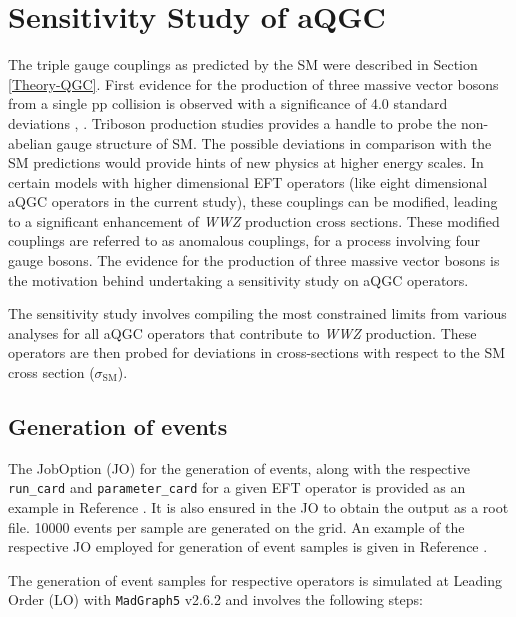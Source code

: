 \section{Sensitivity Study of aQGC}\label{SensitivityStudy}

The triple gauge couplings as predicted by the SM were described in Section \ref{Theory-QGC}. First evidence for the production of three massive vector bosons from a single pp collision is observed with a significance of 4.0 standard deviations  \cite{Cristinziani:2649213}, \cite{Sciandra:2314648}. Triboson production studies provides a handle to probe the non-abelian gauge structure of SM. The possible deviations in comparison with the SM predictions would provide hints of new physics at higher energy scales. In certain models with higher dimensional EFT operators (like eight dimensional aQGC operators in the current study), these couplings can be modified, leading to a significant enhancement of \textit{WWZ} production cross sections. These modified couplings are referred to as anomalous couplings, for a process involving four gauge bosons. The evidence for the production of three massive vector bosons is the motivation behind undertaking a sensitivity study on aQGC operators. 

The sensitivity study involves compiling the most constrained limits from various analyses for all aQGC operators that contribute to \textit{WWZ} production. These operators are then probed for deviations in cross-sections with respect to the SM cross section ($\sigma_\text{SM}$).


\subsection{Generation of events}\label{EventGeneration}
The JobOption (JO) for the generation of events, along with the respective \texttt{run\_card} and \texttt{parameter\_card} for a given EFT operator is provided as an example in Reference \cite{aQGC-GitProject}. It is also ensured in the JO to obtain the output as a root file. 10000 events per sample are generated on the grid. An example of the respective JO employed for generation of event samples is given in Reference \cite{aQGC-GitProject}.

The generation of event samples for respective operators is simulated at Leading Order (LO) with \texttt{MadGraph5} v2.6.2 and involves the following steps:

